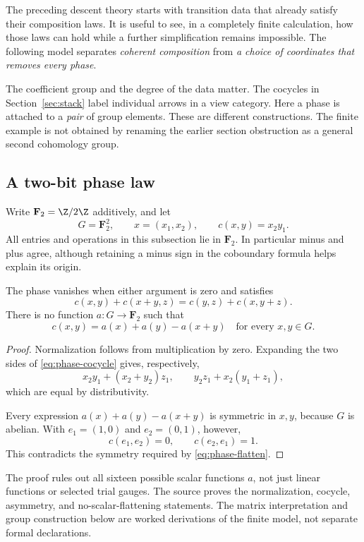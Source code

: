 \label{sec:phase}
The preceding descent theory starts with transition data that already satisfy their composition laws. It is useful to see, in a completely finite calculation, how those laws can hold while a further simplification remains impossible. The following model separates \emph{coherent composition} from \emph{a choice of coordinates that removes every phase}.

The coefficient group and the degree of the data matter. The cocycles in Section~\ref{sec:stack} label individual arrows in a view category. Here a phase is attached to a \emph{pair} of group elements. These are different constructions. The finite example is not obtained by renaming the earlier section obstruction as a general second cohomology group.

\subsection{A two-bit phase law}
Write \(\mathbf F_2=\Z/2\Z\) additively, and let
\[
 G=\mathbf F_2^2,\qquad x=(x_1,x_2),\qquad
 c(x,y)=x_2y_1.
\]
All entries and operations in this subsection lie in \(\mathbf F_2\). In particular minus and plus agree, although retaining a minus sign in the coboundary formula helps explain its origin.

\begin{proposition}\label{KS80}
The phase vanishes when either argument is zero and satisfies
\begin{equation}\label{eq:phase-cocycle}
 c(x,y)+c(x+y,z)=c(y,z)+c(x,y+z).
\end{equation}
There is no function \(a:G\to\mathbf F_2\) such that
\begin{equation}\label{eq:phase-flatten}
 c(x,y)=a(x)+a(y)-a(x+y)\quad\text{for every }x,y\in G.
\end{equation}
\end{proposition}
\begin{proof}
Normalization follows from multiplication by zero. Expanding the two sides of \eqref{eq:phase-cocycle} gives, respectively,
\[
 x_2y_1+(x_2+y_2)z_1,
 \qquad y_2z_1+x_2(y_1+z_1),
\]
which are equal by distributivity.

Every expression \(a(x)+a(y)-a(x+y)\) is symmetric in \(x,y\), because \(G\) is abelian. With \(e_1=(1,0)\) and \(e_2=(0,1)\), however,
\[
 c(e_1,e_2)=0,\qquad c(e_2,e_1)=1.
\]
This contradicts the symmetry required by \eqref{eq:phase-flatten}.
\end{proof}
The proof rules out all sixteen possible scalar functions \(a\), not just linear functions or selected trial gauges. The source  proves the normalization, cocycle, asymmetry, and no-scalar-flattening statements. The matrix interpretation and group construction below are worked derivations of the finite model, not separate formal declarations.

